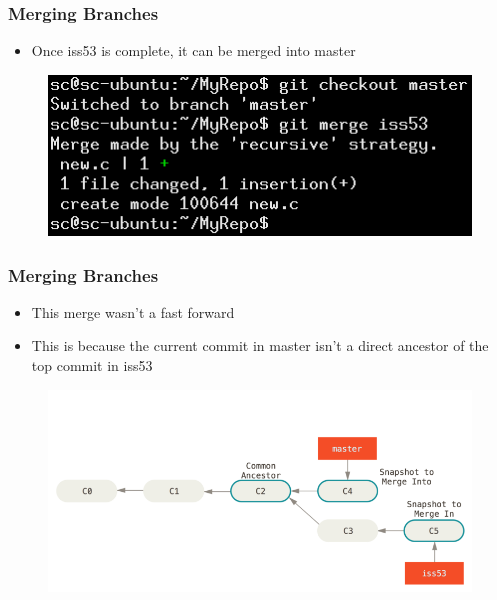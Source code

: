 \documentclass{beamer}
\begin{document}
\begin{frame}
	\frametitle{Merging Branches}
	\begin{itemize}
		\item{Once iss53 is complete, it can be merged into master}
	\end{itemize}
	\begin{figure}
		\includegraphics[scale=0.6]{Merging_Branches-6.png}
	\end{figure}
\end{frame}

\begin{frame}
	\frametitle{Merging Branches}
	\begin{itemize}
		\item{This merge wasn't a fast forward}
		\item{This is because the current commit in master isn't a direct ancestor of the top commit in iss53}
	\end{itemize}
	\begin{figure}
		\includegraphics[scale=0.38]{Merging_Branches-7.png}
	\end{figure}
\end{frame}
\end{document}
